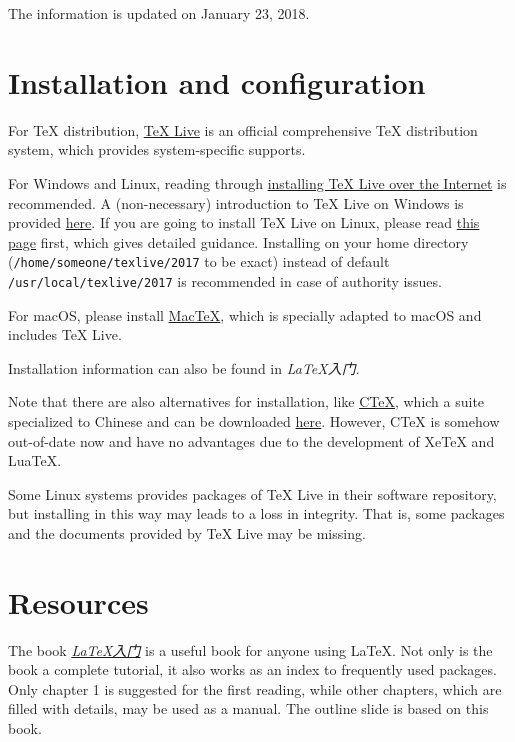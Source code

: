 \documentclass[english]{../TeXTemplate/pkupaper}
\title{\titlemark}
\author{pppppass}
\date{Updated on January 23, 2018}
\begin{document}
\maketitle

The information is updated on January 23, 2018.
 
\section{Installation and configuration}

For \TeX{} distribution, \href{http://www.tug.org/texlive/}{\TeX{} Live} is an official comprehensive TeX distribution system, which provides system-specific supports.

For Windows and Linux, reading through \href{http://www.tug.org/texlive/acquire-netinstall.html}{installing \TeX{} Live over the Internet} is recommended. A (non-necessary) introduction to \TeX{} Live on Windows is provided \href{http://www.tug.org/texlive/windows.html}{here}. If you are going to install \TeX{} Live on Linux, please read \href{http://www.tug.org/texlive/quickinstall.html}{this page} first, which gives detailed guidance. Installing on your home directory (\verb"/home/someone/texlive/2017" to be exact) instead of default \verb"/usr/local/texlive/2017" is recommended in case of authority issues.

For macOS, please install \href{http://www.tug.org/mactex/}{MacTeX}, which is specially adapted to macOS and includes \TeX{} Live.

Installation information can also be found in \emph{\LaTeX 入门}.

Note that there are also alternatives for installation, like \href{http://www.ctex.org/CTeX}{CTeX}, which a suite specialized to Chinese and can be downloaded \href{http://www.ctex.org/CTeXDownload}{here}. However, CTeX is somehow out-of-date now and have no advantages due to the development of XeTeX and LuaTeX.

Some Linux systems provides packages of \TeX{} Live in their software repository, but installing in this way may leads to a loss in integrity. That is, some packages and the documents provided by \TeX{} Live may be missing.

\section{Resources}

The book \href{https://item.jd.com/11258469.html}{\emph{\LaTeX 入门}} is a useful book for anyone using \LaTeX. Not only is the book a complete tutorial, it also works as an index to frequently used packages. Only chapter 1 is suggested for the first reading, while other chapters, which are filled with details, may be used as a manual. The outline slide is based on this book.
\end{document}
